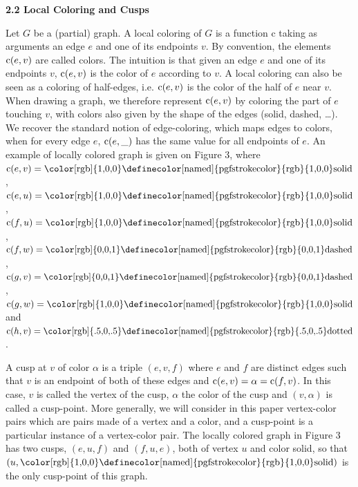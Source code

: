  
 
 
\par\medskip\noindent\textbf{2.2 Local Coloring and Cusps}\par
 
 
Let $G$ be a (partial) graph. A local coloring of $G$ is a function c taking as arguments an edge $e$ and one of its endpoints $v$. By convention, the elements $\textnormal{{c}}(e,v)$ are called colors. The intuition is that given an edge $e$ and one of its endpoints $v$, $\textnormal{{c}}(e,v)$ is the color of $e$ according to $v$. A local coloring can also be seen as a coloring of half-edges, i.e. $\textnormal{{c}}(e,v)$ is the color of the half of $e$ near $v$. When drawing a graph, we therefore represent $\textnormal{{c}}(e,v)$ by coloring the part of $e$ touching $v$, with colors also given by the shape of the edges (solid, dashed, …). We recover the standard notion of edge-coloring, which maps edges to colors, when for every edge $e$, $\textnormal{{c}}(e,\_)$ has the same value for all endpoints of $e$. An example of locally colored graph is given on Figure 3, where $\textnormal{{c}}(e,v)=\text{{\color[rgb]{1,0,0}\definecolor[named]{%
pgfstrokecolor}{rgb}{1,0,0}solid}}$, $\textnormal{{c}}(e,u)=\text{{\color[rgb]{1,0,0}\definecolor[named]{%
pgfstrokecolor}{rgb}{1,0,0}solid}}$, $\textnormal{{c}}(f,u)=\text{{\color[rgb]{1,0,0}\definecolor[named]{%
pgfstrokecolor}{rgb}{1,0,0}solid}}$, $\textnormal{{c}}(f,w)=\text{{\color[rgb]{0,0,1}\definecolor[named]{%
pgfstrokecolor}{rgb}{0,0,1}dashed}}$, $\textnormal{{c}}(g,v)=\text{{\color[rgb]{0,0,1}\definecolor[named]{%
pgfstrokecolor}{rgb}{0,0,1}dashed}}$, $\textnormal{{c}}(g,w)=\text{{\color[rgb]{1,0,0}\definecolor[named]{%
pgfstrokecolor}{rgb}{1,0,0}solid}}$ and $\textnormal{{c}}(h,v)=\text{{\color[rgb]{.5,0,.5}\definecolor[named]{%
pgfstrokecolor}{rgb}{.5,0,.5}dotted}}$.\par
 
 
 
A cusp at $v$ of color $\alpha$ is a triple $(e,v,f)$ where $e$ and $f$ are distinct edges such that $v$ is an endpoint of both of these edges and $\textnormal{{c}}(e,v)=\alpha=\textnormal{{c}}(f,v)$. In this case, $v$ is called the vertex of the cusp, $\alpha$ the color of the cusp and $(v,\alpha)$ is called a cusp-point. More generally, we will consider in this paper vertex-color pairs which are pairs made of a vertex and a color, and a cusp-point is a particular instance of a vertex-color pair. The locally colored graph in Figure 3 has two cusps, $(e,u,f)$ and $(f,u,e)$, both of vertex $u$ and color solid, so that $(u,\text{{\color[rgb]{1,0,0}\definecolor[named]{pgfstrokecolor}{rgb}{1,0,0}%
solid}})$ is the only cusp-point of this graph.\par
 
